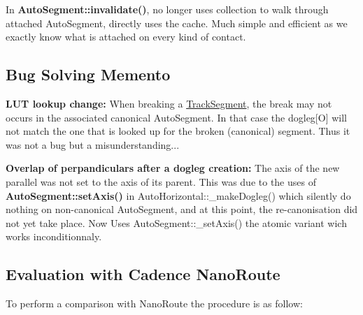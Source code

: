\begin{DoxyItemize}
\item In \textbf{ Auto\+Segment\+::invalidate()}, no longer uses collection to walk through attached Auto\+Segment, directly uses the cache. Much simple and efficient as we exactly know what is attached on every kind of contact.
\end{DoxyItemize}\hypertarget{pageNotes_ssecBugBusting}{}\subsection{Bug Solving Memento}\label{pageNotes_ssecBugBusting}
{\bfseries L\+UT lookup change\+:} When breaking a \mbox{\hyperlink{classKite_1_1TrackSegment}{Track\+Segment}}, the break may not occurs in the associated canonical Auto\+Segment. In that case the {\ttfamily dogleg\mbox{[}O\mbox{]}} will not match the one that is looked up for the broken (canonical) segment. Thus it was not a bug but a misunderstanding...

{\bfseries Overlap of perpandiculars after a dogleg creation\+:} The axis of the new parallel was not set to the axis of it\textquotesingle{}s parent. This was due to the uses of \textbf{ Auto\+Segment\+::set\+Axis()} in Auto\+Horizontal\+::\+\_\+make\+Dogleg() which silently do nothing on non-\/canonical Auto\+Segment, and at this point, the re-\/canonisation did not yet take place. Now Uses Auto\+Segment\+::\+\_\+set\+Axis() the atomic variant wich works inconditionnaly.\hypertarget{pageNotes_ssecNanoRoute}{}\subsection{Evaluation with Cadence Nano\+Route}\label{pageNotes_ssecNanoRoute}
To perform a comparison with Nano\+Route the procedure is as follow\+:


